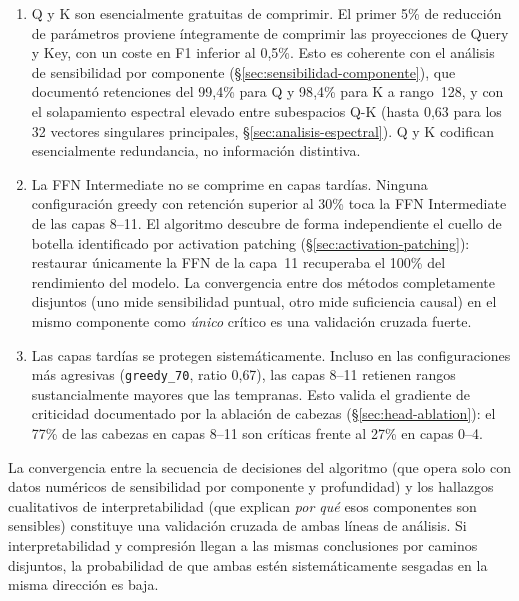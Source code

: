 \begin{enumerate}
    \item Q y K son esencialmente gratuitas de comprimir. El
    primer 5\% de reducción de parámetros proviene íntegramente de
    comprimir las proyecciones de Query y Key, con un coste en F1 inferior
    al 0{,}5\%. Esto es coherente con el análisis de sensibilidad por
    componente (\S\ref{sec:sensibilidad-componente}), que documentó
    retenciones del 99{,}4\% para Q y 98{,}4\% para K a rango~128, y con
    el solapamiento espectral elevado entre subespacios Q-K
    (hasta 0{,}63 para los 32 vectores singulares principales,
    \S\ref{sec:analisis-espectral}). Q y K codifican esencialmente
    redundancia, no información distintiva.

    \item La FFN Intermediate no se comprime en capas tardías.
    Ninguna configuración greedy con retención superior al 30\% toca la
    FFN Intermediate de las capas 8--11. El algoritmo descubre de forma
    independiente el cuello de botella identificado por activation
    patching (\S\ref{sec:activation-patching}): restaurar únicamente la
    FFN de la capa~11 recuperaba el 100\% del rendimiento del modelo. La
    convergencia entre dos métodos completamente disjuntos (uno mide
    sensibilidad puntual, otro mide suficiencia causal) en el mismo
    componente como \emph{único} crítico es una validación cruzada fuerte.

    \item Las capas tardías se protegen sistemáticamente. Incluso
    en las configuraciones más agresivas (\texttt{greedy\_70}, ratio
    0{,}67), las capas 8--11 retienen rangos sustancialmente mayores que
    las tempranas. Esto valida el gradiente de criticidad documentado por
    la ablación de cabezas (\S\ref{sec:head-ablation}): el 77\% de las
    cabezas en capas 8--11 son críticas frente al 27\% en capas 0--4.
\end{enumerate}

La convergencia entre la secuencia de decisiones del algoritmo (que opera
solo con datos numéricos de sensibilidad por componente y profundidad) y
los hallazgos cualitativos de interpretabilidad (que explican \emph{por
qué} esos componentes son sensibles) constituye una validación cruzada de
ambas líneas de análisis. Si interpretabilidad y compresión llegan a las
mismas conclusiones por caminos disjuntos, la probabilidad de que ambas
estén sistemáticamente sesgadas en la misma dirección es baja.


